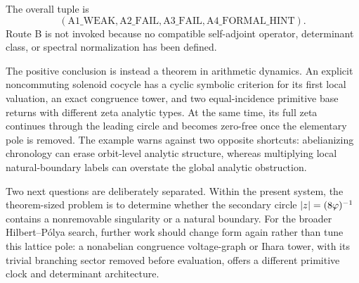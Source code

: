 The overall tuple is
\[
 \boxed{(\mathrm{A1\_WEAK},\mathrm{A2\_FAIL},
 \mathrm{A3\_FAIL},\mathrm{A4\_FORMAL\_HINT})}.
\]
Route B is not invoked because no compatible self-adjoint operator,
determinant class, or spectral normalization has been defined.

The positive conclusion is instead a theorem in arithmetic dynamics.  An
explicit noncommuting solenoid cocycle has a cyclic symbolic criterion for
its first local valuation, an exact congruence tower, and two equal-incidence
primitive base returns with different zeta analytic types.  At the same time,
its full zeta continues through the leading circle and becomes zero-free once
the elementary pole is removed.  The example warns against two opposite
shortcuts: abelianizing chronology can erase orbit-level analytic structure,
whereas multiplying local natural-boundary labels can overstate the global
analytic obstruction.

Two next questions are deliberately separated.  Within the present system,
the theorem-sized problem is to determine whether the secondary circle
\(|z|=(8\varphi)^{-1}\) contains a nonremovable singularity or a natural
boundary.  For the broader Hilbert--P\'olya search, further work should change
form again rather than tune this lattice pole: a nonabelian congruence
voltage-graph or Ihara tower, with its trivial branching sector removed before
evaluation, offers a different primitive clock and determinant architecture.
